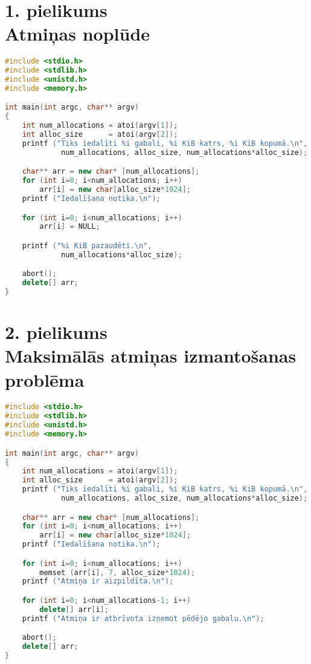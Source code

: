 ﻿

\chapter[1. pielikums. Atmiņas noplūde] {1. pielikums \\  Atmiņas noplūde}

    
   
\begin{lstlisting}[language=C++]
#include <stdio.h>
#include <stdlib.h>
#include <unistd.h>
#include <memory.h>

int main(int argc, char** argv)
{
	int num_allocations = atoi(argv[1]);
	int alloc_size      = atoi(argv[2]);
	printf ("Tiks iedalīti %i gabali, %i KiB katrs, %i KiB kopumā.\n",
	         num_allocations, alloc_size, num_allocations*alloc_size);

	char** arr = new char* [num_allocations];
	for (int i=0; i<num_allocations; i++)
		arr[i] = new char[alloc_size*1024];
	printf ("Iedalīšana notika.\n");

	for (int i=0; i<num_allocations; i++)
		arr[i] = NULL;

	printf ("%i KiB pazaudēti.\n", 
	         num_allocations*alloc_size);

	abort();
	delete[] arr;
} 
\end{lstlisting}

\newpage
\chapter[2. pielikums. Maksimālās atmiņas izmantošanas problēma] {2. pielikums \\  Maksimālās atmiņas izmantošanas problēma}



\begin{lstlisting}[language=C++]
#include <stdio.h>
#include <stdlib.h>
#include <unistd.h>
#include <memory.h>

int main(int argc, char** argv)
{
	int num_allocations = atoi(argv[1]);
	int alloc_size      = atoi(argv[2]);
	printf ("Tiks iedalīti %i gabali, %i KiB katrs, %i KiB kopumā.\n",
	         num_allocations, alloc_size, num_allocations*alloc_size);

	char** arr = new char* [num_allocations];
	for (int i=0; i<num_allocations; i++)
		arr[i] = new char[alloc_size*1024];
	printf ("Iedalīšana notika.\n");

	for (int i=0; i<num_allocations; i++)
		memset (arr[i], 7, alloc_size*1024);
	printf ("Atmiņa ir aizpildīta.\n");

	for (int i=0; i<num_allocations-1; i++)
		delete[] arr[i];
	printf ("Atmiņa ir atbrīvota izņemot pēdējo gabalu.\n");

	abort();
	delete[] arr;
} 
\end{lstlisting}

